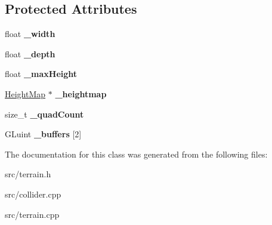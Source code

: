 \subsection*{Protected Attributes}
\begin{DoxyCompactItemize}
\item 
\hypertarget{class_terrain_a09c59ff7e1157133d65a8bd44538da18}{}float {\bfseries \+\_\+width}\label{class_terrain_a09c59ff7e1157133d65a8bd44538da18}

\item 
\hypertarget{class_terrain_a4e90b826e3264d2587c7c30ebce7ad7e}{}float {\bfseries \+\_\+depth}\label{class_terrain_a4e90b826e3264d2587c7c30ebce7ad7e}

\item 
\hypertarget{class_terrain_aa126dea886f1c6d2f631c3547cfdf6ed}{}float {\bfseries \+\_\+max\+Height}\label{class_terrain_aa126dea886f1c6d2f631c3547cfdf6ed}

\item 
\hypertarget{class_terrain_a588e32d26d9219e693791ac05e14c458}{}\hyperlink{class_height_map}{Height\+Map} $\ast$ {\bfseries \+\_\+heightmap}\label{class_terrain_a588e32d26d9219e693791ac05e14c458}

\item 
\hypertarget{class_terrain_a41f2e7ff20e2e2f64bb4704db2dcc777}{}size\+\_\+t {\bfseries \+\_\+quad\+Count}\label{class_terrain_a41f2e7ff20e2e2f64bb4704db2dcc777}

\item 
\hypertarget{class_terrain_abb35500afa68d004491e95db62b7fcdf}{}G\+Luint {\bfseries \+\_\+buffers} \mbox{[}2\mbox{]}\label{class_terrain_abb35500afa68d004491e95db62b7fcdf}

\end{DoxyCompactItemize}


The documentation for this class was generated from the following files\+:\begin{DoxyCompactItemize}
\item 
src/terrain.\+h\item 
src/collider.\+cpp\item 
src/terrain.\+cpp\end{DoxyCompactItemize}

